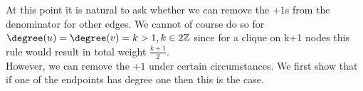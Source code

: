 At this point it is natural to ask whether we can remove the $+1$s from the denominator for other edges.  We cannot of course do so for $\degree(u) = \degree(v) = k >1, k \in 2\mathbb{Z}$ since for a clique on k+1 nodes this rule would result in total weight $\frac{k+1}{2}$.\\

However, we can remove the $+1$ under certain circumstances.
\fi
\iffalse
We first show that if one of the endpoints has degree one then this is the case.

